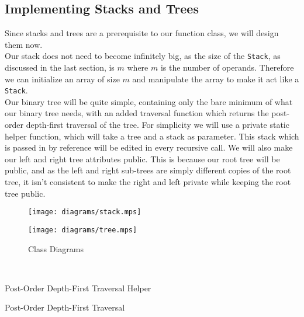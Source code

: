 \documentclass[../../../../../main.tex]{subfiles}
\begin{document}
\subsection{Implementing Stacks and Trees}
Since stacks and trees are a prerequisite to our function class, we will design them now.\\
Our stack does not need to become infinitely big, as the size of the \texttt{Stack}, as discussed in the last section, is $m$ where $m$ is the number of operands. Therefore we can initialize an array of size $m$ and manipulate the array to make it act like a \texttt{Stack}.\\
Our binary tree will be quite simple, containing only the bare minimum of what our binary tree needs, with an added traversal function which returns the post-order depth-first traversal of the tree. For simplicity we will use a private static helper function, which will take a tree and a stack as parameter. This stack which is passed in by reference will be edited in every recursive call. We will also make our left and right tree attributes public. This is because our root tree will be public, and as the left and right sub-trees are simply different copies of the root tree, it isn't consistent to make the right and left private while keeping the root tree public.\\
\begin{figure}[h]
\centering
\begin{minipage}{.5\textwidth}
  \centering
  \texttt{[image: diagrams/stack.mps]}
\end{minipage}%
\begin{minipage}{.5\textwidth}
  \centering
  \texttt{[image: diagrams/tree.mps]}
\end{minipage}

\caption{Class Diagrams}
\end{figure}
\\
\begin{algorithm}
\caption{Post-Order Depth-First Traversal Helper}
\label{alg:traverseHelper}
\DontPrintSemicolon
{}
\end{algorithm}
\begin{algorithm}
\caption{Post-Order Depth-First Traversal}
\label{alg:traverse}
\DontPrintSemicolon
{}
\end{algorithm}

\newpage
\end{document}
